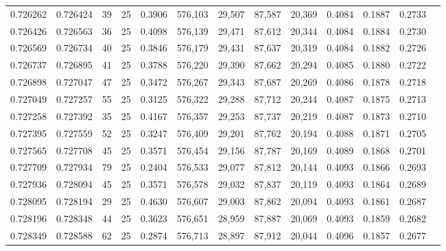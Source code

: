 \begin{tabular}{rrrrrrrrrrrrr}
0.726262 & 0.726424 &    39 &  25 &                                     0.3906 & 576,103 &  29,507 &  87,587 &  20,369 & 0.4084 & 0.1887 & 0.2733 \\
0.726426 & 0.726563 &    36 &  25 &                                     0.4098 & 576,139 &  29,471 &  87,612 &  20,344 & 0.4084 & 0.1884 & 0.2730 \\
0.726569 & 0.726734 &    40 &  25 &                                     0.3846 & 576,179 &  29,431 &  87,637 &  20,319 & 0.4084 & 0.1882 & 0.2726 \\
0.726737 & 0.726895 &    41 &  25 &                                     0.3788 & 576,220 &  29,390 &  87,662 &  20,294 & 0.4085 & 0.1880 & 0.2722 \\
0.726898 & 0.727047 &    47 &  25 &                                     0.3472 & 576,267 &  29,343 &  87,687 &  20,269 & 0.4086 & 0.1878 & 0.2718 \\
0.727049 & 0.727257 &    55 &  25 &                                     0.3125 & 576,322 &  29,288 &  87,712 &  20,244 & 0.4087 & 0.1875 & 0.2713 \\
0.727258 & 0.727392 &    35 &  25 &                                     0.4167 & 576,357 &  29,253 &  87,737 &  20,219 & 0.4087 & 0.1873 & 0.2710 \\
0.727395 & 0.727559 &    52 &  25 &                                     0.3247 & 576,409 &  29,201 &  87,762 &  20,194 & 0.4088 & 0.1871 & 0.2705 \\
0.727565 & 0.727708 &    45 &  25 &                                     0.3571 & 576,454 &  29,156 &  87,787 &  20,169 & 0.4089 & 0.1868 & 0.2701 \\
0.727709 & 0.727934 &    79 &  25 &                                     0.2404 & 576,533 &  29,077 &  87,812 &  20,144 & 0.4093 & 0.1866 & 0.2693 \\
0.727936 & 0.728094 &    45 &  25 &                                     0.3571 & 576,578 &  29,032 &  87,837 &  20,119 & 0.4093 & 0.1864 & 0.2689 \\
0.728095 & 0.728194 &    29 &  25 &                                     0.4630 & 576,607 &  29,003 &  87,862 &  20,094 & 0.4093 & 0.1861 & 0.2687 \\
0.728196 & 0.728348 &    44 &  25 &                                     0.3623 & 576,651 &  28,959 &  87,887 &  20,069 & 0.4093 & 0.1859 & 0.2682 \\
0.728349 & 0.728588 &    62 &  25 &                                     0.2874 & 576,713 &  28,897 &  87,912 &  20,044 & 0.4096 & 0.1857 & 0.2677 \\

\end{tabular}
